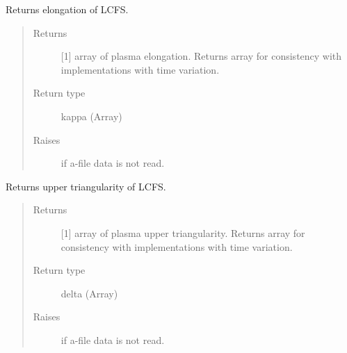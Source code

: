 \documentclass[letterpaper,10pt,english]{sphinxmanual}
\begin{document}
\begin{fulllineitems}

\begin{fulllineitems}
\label{\detokenize{eqtools:eqtools.eqdskreader.EqdskReader.getElongation}}
Returns elongation of LCFS.
\begin{quote}\begin{description}
\item[{Returns}] \leavevmode
{[}1{]} array of plasma elongation.  Returns array for
consistency with
{\hyperref[\detokenize{eqtools:eqtools.core.Equilibrium}]{}}
implementations with time variation.

\item[{Return type}] \leavevmode
kappa (Array)

\item[{Raises}] \leavevmode
{} \textendash{} if a-file data is not read.

\end{description}\end{quote}

\end{fulllineitems}


\begin{fulllineitems}
\label{\detokenize{eqtools:eqtools.eqdskreader.EqdskReader.getUpperTriangularity}}
Returns upper triangularity of LCFS.
\begin{quote}\begin{description}
\item[{Returns}] \leavevmode
{[}1{]} array of plasma upper triangularity.  Returns
array for consistency with
{\hyperref[\detokenize{eqtools:eqtools.core.Equilibrium}]{}}
implementations with time variation.

\item[{Return type}] \leavevmode
delta (Array)

\item[{Raises}] \leavevmode
{} \textendash{} if a-file data is not read.


\end{description}
\end{quote}
\end{fulllineitems}
\end{fulllineitems}
\end{document}
